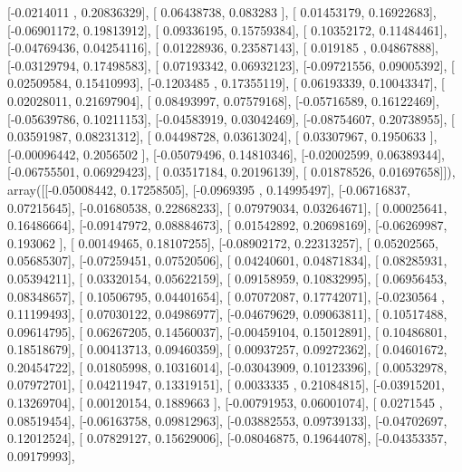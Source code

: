 \documentclass{article}
\begin{document}
       [-0.0214011 ,  0.20836329],
       [ 0.06438738,  0.083283  ],
       [ 0.01453179,  0.16922683],
       [-0.06901172,  0.19813912],
       [ 0.09336195,  0.15759384],
       [ 0.10352172,  0.11484461],
       [-0.04769436,  0.04254116],
       [ 0.01228936,  0.23587143],
       [ 0.019185  ,  0.04867888],
       [-0.03129794,  0.17498583],
       [ 0.07193342,  0.06932123],
       [-0.09721556,  0.09005392],
       [ 0.02509584,  0.15410993],
       [-0.1203485 ,  0.17355119],
       [ 0.06193339,  0.10043347],
       [ 0.02028011,  0.21697904],
       [ 0.08493997,  0.07579168],
       [-0.05716589,  0.16122469],
       [-0.05639786,  0.10211153],
       [-0.04583919,  0.03042469],
       [-0.08754607,  0.20738955],
       [ 0.03591987,  0.08231312],
       [ 0.04498728,  0.03613024],
       [ 0.03307967,  0.1950633 ],
       [-0.00096442,  0.2056502 ],
       [-0.05079496,  0.14810346],
       [-0.02002599,  0.06389344],
       [-0.06755501,  0.06929423],
       [ 0.03517184,  0.20196139],
       [ 0.01878526,  0.01697658]]), array([[-0.05008442,  0.17258505],
       [-0.0969395 ,  0.14995497],
       [-0.06716837,  0.07215645],
       [-0.01680538,  0.22868233],
       [ 0.07979034,  0.03264671],
       [ 0.00025641,  0.16486664],
       [-0.09147972,  0.08884673],
       [ 0.01542892,  0.20698169],
       [-0.06269987,  0.193062  ],
       [ 0.00149465,  0.18107255],
       [-0.08902172,  0.22313257],
       [ 0.05202565,  0.05685307],
       [-0.07259451,  0.07520506],
       [ 0.04240601,  0.04871834],
       [ 0.08285931,  0.05394211],
       [ 0.03320154,  0.05622159],
       [ 0.09158959,  0.10832995],
       [ 0.06956453,  0.08348657],
       [ 0.10506795,  0.04401654],
       [ 0.07072087,  0.17742071],
       [-0.0230564 ,  0.11199493],
       [ 0.07030122,  0.04986977],
       [-0.04679629,  0.09063811],
       [ 0.10517488,  0.09614795],
       [ 0.06267205,  0.14560037],
       [-0.00459104,  0.15012891],
       [ 0.10486801,  0.18518679],
       [ 0.00413713,  0.09460359],
       [ 0.00937257,  0.09272362],
       [ 0.04601672,  0.20454722],
       [ 0.01805998,  0.10316014],
       [-0.03043909,  0.10123396],
       [ 0.00532978,  0.07972701],
       [ 0.04211947,  0.13319151],
       [ 0.0033335 ,  0.21084815],
       [-0.03915201,  0.13269704],
       [ 0.00120154,  0.1889663 ],
       [-0.00791953,  0.06001074],
       [ 0.0271545 ,  0.08519454],
       [-0.06163758,  0.09812963],
       [-0.03882553,  0.09739133],
       [-0.04702697,  0.12012524],
       [ 0.07829127,  0.15629006],
       [-0.08046875,  0.19644078],
       [-0.04353357,  0.09179993],
\end{document}
